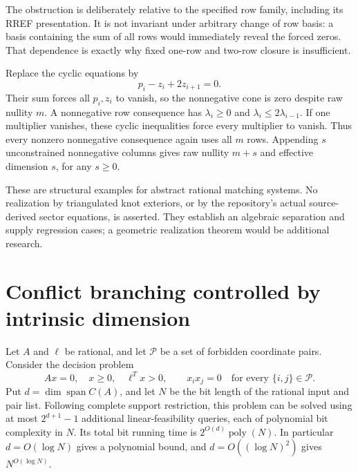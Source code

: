 The obstruction is deliberately relative to the specified row family,
including its RREF presentation.  It is not invariant under arbitrary
change of row basis: a basis containing the sum of all rows would
immediately reveal the forced zeros.  That dependence is exactly why
fixed one-row and two-row closure is insufficient.

\begin{example}
Replace the cyclic equations by
\[
 p_i-z_i+2z_{i+1}=0.
\]
Their sum forces all $p_i,z_i$ to vanish, so the nonnegative cone is
zero despite raw nullity $m$.  A nonnegative row consequence has
$\lambda_i\geq0$ and $\lambda_i\leq2\lambda_{i-1}$.  If one
multiplier vanishes, these cyclic inequalities force every multiplier
to vanish.  Thus every nonzero nonnegative consequence again uses all
$m$ rows.  Appending $s$ unconstrained nonnegative columns gives raw
nullity $m+s$ and effective dimension $s$, for any $s\geq0$.
\end{example}

These are structural examples for abstract rational matching systems.
No realization by triangulated knot exteriors, or by the repository's
actual source-derived sector equations, is asserted.  They establish
an algebraic separation and supply regression cases; a geometric
realization theorem would be additional research.

\section{Conflict branching controlled by intrinsic dimension}

\begin{theorem}
Let $A$ and $\ell$ be rational, and let $\mathcal P$ be a set of
forbidden coordinate pairs.  Consider the decision problem
\[
 Ax=0,\quad x\geq0,\quad \ell^Tx>0,
 \qquad x_ix_j=0\quad\text{for every }\{i,j\}\in\mathcal P.
\]
Put $d=\dim\operatorname{span}C(A)$, and let $N$ be the bit length of
the rational input and pair list.  Following complete support
restriction, this problem can be solved using at most
$2^{d+1}-1$ additional linear-feasibility queries, each of polynomial
bit complexity in $N$.  Its total bit running time is
$2^{O(d)}\operatorname{poly}(N)$.
In particular $d=O(\log N)$ gives a polynomial bound, and
$d=O((\log N)^2)$ gives $N^{O(\log N)}$.
\end{theorem}

